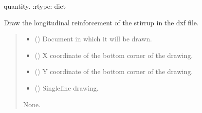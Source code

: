 \documentclass[a4paper,10pt,english]{sphinxmanual}
\begin{document}
\begin{fulllineitems}
\begin{fulllineitems}
\sphinxAtStartPar
quantity.
:rtype: dict

\end{fulllineitems}


\begin{fulllineitems}
\label{\detokenize{API:etacad.stirrup.Stirrup.draw_longitudinal}}
\pysigstartsignatures
{}
\pysigstopsignatures
\sphinxAtStartPar
Draw the longitudinal reinforcement of the stirrup in the dxf file.
\begin{quote}\begin{description}
\begin{itemize}
\item {} 
\sphinxAtStartPar
{} () \textendash{} Document in which it will be drawn.

\item {} 
\sphinxAtStartPar
{} () \textendash{} X coordinate of the bottom corner of the drawing.

\item {} 
\sphinxAtStartPar
{} () \textendash{} Y coordinate of the bottom corner of the drawing.

\item {} 
\sphinxAtStartPar
{} () \textendash{} Single\sphinxhyphen{}line drawing.

\end{itemize}

\sphinxAtStartPar
None.


\end{description}
\end{quote}
\end{fulllineitems}
\end{fulllineitems}
\end{document}
